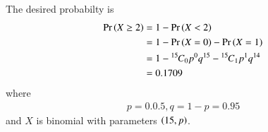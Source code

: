 The desired probabilty is 
\begin{align}
    \Pr\left(X \ge 2 \right) &= 1 - \Pr\left(X < 2 \right)
    \\
    &= 1-\Pr\left(X=0\right)-\Pr\left(X=1\right)
    \\
    &= 1-{{}^{15}\mkern-1muC_{0}} p^{0} q^{15} -{{}^{15}\mkern-1muC_{1}} p^{1} q^{14}
    \\
    &=0.1709   
\end{align}
%
where 
\begin{align}
    p = 0.0.5, q = 1-p = 0.95
\end{align}
%
and $X$ is binomial with parameters $\left(15, p\right)$.
